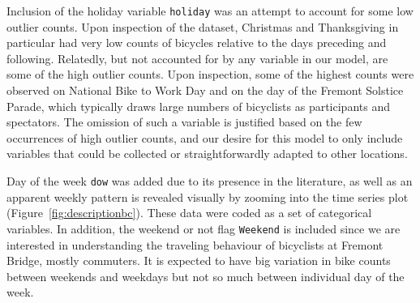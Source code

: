 \documentclass [11pt, proquest] {uwthesis}[2015/03/03]
\begin{document}
Inclusion of the holiday variable \texttt{holiday} was an attempt to account for some low outlier counts. Upon inspection of the dataset, Christmas and Thanksgiving in particular had very low counts of bicycles relative to the days preceding and following. Relatedly, but not accounted for by any variable in our model, are some of the high outlier counts. Upon inspection, some of the highest counts were observed on National Bike to Work Day and on the day of the Fremont Solstice Parade, which typically draws large numbers of bicyclists as participants and spectators. The omission of such a variable is justified based on the few occurrences of high outlier counts, and our desire for this model to only include variables that could be collected or straightforwardly adapted to other locations.

Day of the week \texttt{dow} was added due to its presence in the literature, as well as an apparent weekly pattern is revealed visually by zooming into the time series plot (Figure~\ref{fig:descriptionbc}). These data were coded as a set of  categorical variables. In addition, the weekend or not flag \texttt{Weekend} is included since we are interested in understanding the traveling behaviour of bicyclists at Fremont Bridge, mostly commuters. It is expected to have big variation in bike counts between weekends and weekdays but not so much between individual day of the week. 
\end{document}

